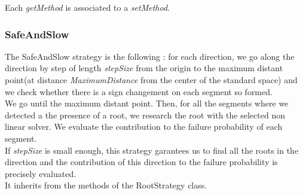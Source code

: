 \begin{description}
Each \textit{getMethod}  is associated to a \textit{setMethod}.

\end{description}
\newpage
\subsubsection{SafeAndSlow}

The SafeAndSlow strategy is the following : for each direction, we go along the direction by step of length {\itshape stepSize} from the origin to the maximum distant point(at distance {\itshape MaximumDistance} from the center of the standard space) and we check whether there is a sign changement on each segment so formed.\\
We go until the maximum distant point.  Then, for all the segments where we detected a the presence of a root, we research the root with the selected non linear solver. We evaluate the contribution to the failure probability of each segment. \\
If {\itshape stepSize} is small enough, this strategy garantees us to find all the roots in the direction and the contribution of this direction to the failure probability is precisely evaluated.\\

It inherits from the methods of the RootStrategy class.

